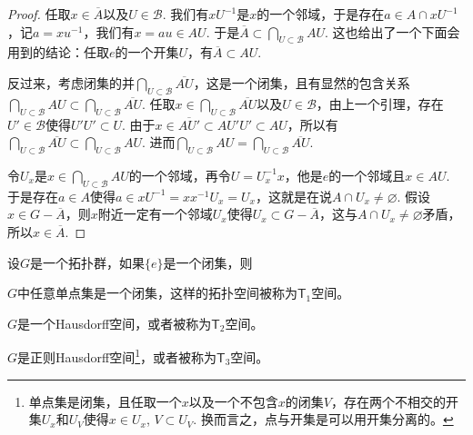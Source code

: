 \begin{proof}
	任取$x\in \overline{A}$以及$U\in \mathscr{B}$. 我们有$xU^{-1}$是$x$的一个邻域，于是存在$a\in A\cap x U^{-1}$，记$a=xu^{-1}$，我们有$x=au\in AU$. 于是$\overline{A}\subset \bigcap_{U\subset \mathscr{B}}AU$. 这也给出了一个下面会用到的结论：任取$e$的一个开集$U$，有$\overline{A}\subset AU$.

	反过来，考虑闭集的并$\bigcap_{U\subset \mathscr{B}}\overline{AU}$，这是一个闭集，且有显然的包含关系$\bigcap_{U\subset \mathscr{B}}AU\subset \bigcap_{U\subset \mathscr{B}}\overline{AU}$. 任取$x\in \bigcap_{U\subset \mathscr{B}}\overline{AU}$以及$U\in \mathscr{B}$，由上一个引理，存在$U'\in \mathscr{B}$使得$U'U'\subset U$. 由于$x\in \overline{AU'}\subset AU'U'\subset AU$，所以有$\bigcap_{U\subset \mathscr{B}}\overline{AU}\subset \bigcap_{U\subset \mathscr{B}}AU$. 进而$\bigcap_{U\subset \mathscr{B}}AU=\bigcap_{U\subset \mathscr{B}}\overline{AU}$.

	令$U_x$是$x\in \bigcap_{U\subset \mathscr{B}}AU$的一个邻域，再令$U=U_x^{-1}x$，他是$e$的一个邻域且$x\in AU$. 于是存在$a\in A$使得$a\in xU^{-1}=xx^{-1}U_x=U_x$，这就是在说$A\cap U_x\neq \varnothing$. 假设$x\in G-\overline{A}$，则$x$附近一定有一个邻域$U_x$使得$U_x\subset G-\overline{A}$，这与$A\cap U_x\neq \varnothing$矛盾，所以$x\in \overline{A}$.
\end{proof}



\begin{pro}\label{pro:3}
设$G$是一个拓扑群，如果$\{e\}$是一个闭集，则

\begin{compactenum}
\item $G$中任意单点集是一个闭集，这样的拓扑空间被称为$\mathsf{T}_1$空间。

\item $G$是一个Hausdorff空间，或者被称为$\mathsf{T}_2$空间。

\item $G$是正则Hausdorff空间\footnote{单点集是闭集，且任取一个$x$以及一个不包含$x$的闭集$V$，存在两个不相交的开集$U_x$和$U_V$使得$x\in U_x$, $V\subset U_V$. 换而言之，点与开集是可以用开集分离的。}，或者被称为$\mathsf{T}_3$空间。
\end{compactenum}
\end{pro}

